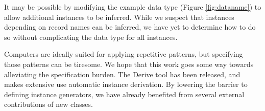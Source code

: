 \documentclass{llncs}
\begin{document}
It may be possible by modifying the example data type (Figure \ref{fig:dataname}) to allow additional instances to be inferred. While we suspect that instances depending on record names can be inferred, we have yet to determine how to do so without complicating the data type for all instances.

Computers are ideally suited for applying repetitive patterns, but specifying those patterns can be tiresome. We hope that this work goes some way towards alleviating the specification burden. The Derive tool has been released, and makes extensive use automatic instance derivation. By lowering the barrier to defining instance generators, we have already benefited from several external contributions of new classes.



\end{document}
